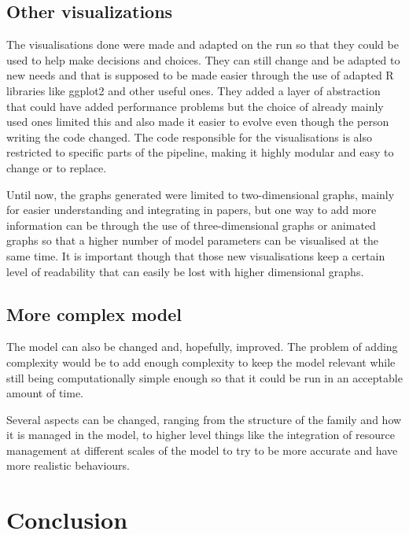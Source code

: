\documentclass[a4paper,12pt]{report}
\begin{document}
\section{Other visualizations}
The visualisations done were made and adapted on the run so that they could be used to help make decisions and choices. They can still change and be adapted to new needs and that is supposed to be made easier through the use of adapted R libraries like ggplot2 and other useful ones. They added a layer of abstraction that could have added performance problems but the choice of already mainly used ones limited this and also made it easier to evolve even though the person writing the code changed. The code responsible for the visualisations is also restricted to specific parts of the pipeline, making it highly modular and easy to change or to replace.

Until now, the graphs generated were limited to two-dimensional graphs, mainly for easier understanding and integrating in papers, but one way to add more information can be through the use of three-dimensional graphs or animated graphs so that a higher number of model parameters can be visualised at the same time. It is important though that those new visualisations keep a certain level of readability that can easily be lost with higher dimensional graphs.

\section{More complex model}
The model can also be changed and, hopefully, improved. The problem of adding complexity would be to add enough complexity to keep the model relevant while still being computationally simple enough so that it could be run in an acceptable amount of time.

Several aspects can be changed, ranging from the structure of the family and how it is managed in the model, to higher level things like the integration of resource management at different scales of the model to try to be more accurate and have more realistic behaviours.


\chapter*{Conclusion}
\end{document}

